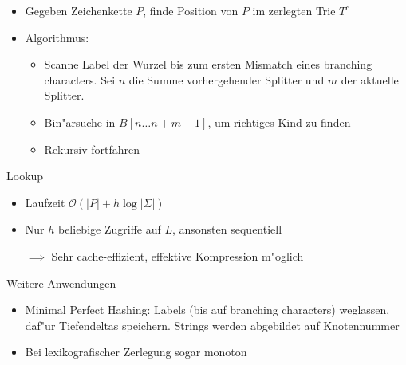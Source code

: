 \documentclass[ngerman,hyperref={pdfpagelabels=true}]{beamer}
\begin{document}
\begin{frame}
\centering



\begin{itemize}
\item Gegeben Zeichenkette $P$, finde Position von $P$ im zerlegten Trie $T^c$
\item Algorithmus:
\begin{itemize}
\item Scanne Label der Wurzel bis zum ersten Mismatch eines branching characters.
Sei $n$ die Summe vorhergehender Splitter und $m$ der aktuelle Splitter.
\item Bin"arsuche in $B[n \ldots n+m-1]$, um richtiges Kind zu finden
\item Rekursiv fortfahren
\end{itemize}

\end{itemize}
\end{frame}

\begin{frame}
\begin{block}{Lookup}
\begin{itemize}
\item Laufzeit $\mathcal{O}\left(|P| + h\log |\Sigma|\right)$
\item Nur $h$ beliebige Zugriffe auf $L$, ansonsten sequentiell
\item[$\implies$] Sehr cache-effizient, effektive Kompression m"oglich
\end{itemize}
\end{block}

\begin{block}{Weitere Anwendungen}
\begin{itemize}
\item Minimal Perfect Hashing: Labels (bis auf branching characters) weglassen, daf"ur
Tiefendeltas speichern. Strings werden abgebildet auf Knotennummer
\item Bei lexikografischer Zerlegung sogar monoton
\end{itemize}
\end{block}
\end{frame}
\end{document}
